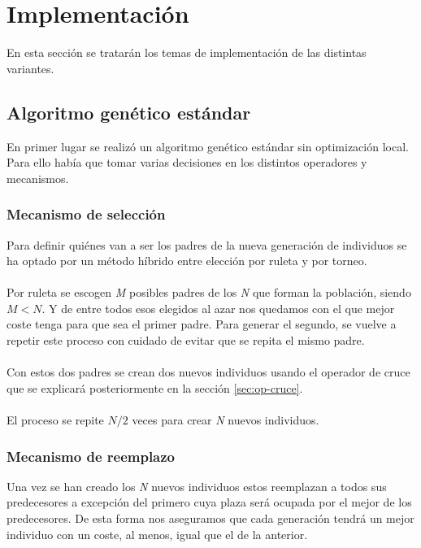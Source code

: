\section{Implementación}

En esta sección se tratarán los temas de implementación de las distintas variantes.

\subsection{Algoritmo genético estándar}

En primer lugar se realizó un algoritmo genético estándar sin optimización local. Para ello había que tomar varias decisiones en los distintos operadores y mecanismos.

\subsubsection{Mecanismo de selección}

Para definir quiénes van a ser los padres de la nueva generación de individuos se ha optado por un método híbrido entre elección por ruleta y por torneo. 
\\ \\
Por ruleta se escogen \textit{M} posibles padres de los \textit{N} que forman la población, siendo $ M < N $. Y de entre todos esos elegidos al azar nos quedamos con el que mejor coste tenga para que sea el primer padre. Para generar el segundo, se vuelve a repetir este proceso con cuidado de evitar que se repita el mismo padre.
\\ \\
Con estos dos padres se crean dos nuevos individuos usando el operador de cruce que se explicará posteriormente en la sección \ref{sec:op-cruce}.
\\ \\
El proceso se repite $ N / 2 $ veces para crear \textit{N} nuevos individuos.

\subsubsection{Mecanismo de reemplazo}

Una vez se han creado los \textit{N} nuevos individuos estos reemplazan a todos sus predecesores a excepción del primero cuya plaza será ocupada por el mejor de los predecesores. De esta forma nos aseguramos que cada generación tendrá un mejor individuo con un coste, al menos, igual que el de la anterior.

